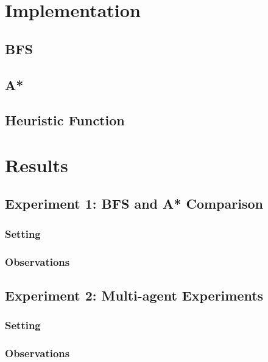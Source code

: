 \documentclass[11pt]{article}
\begin{document}
\section{Implementation}

\subsection{BFS}

\subsection{A*}

\subsection{Heuristic Function}


\section{Results}

\subsection{Experiment 1: BFS and A* Comparison}

\subsubsection{Setting}

\subsubsection{Observations}


\subsection{Experiment 2: Multi-agent Experiments}

\subsubsection{Setting}

\subsubsection{Observations}
\end{document}
